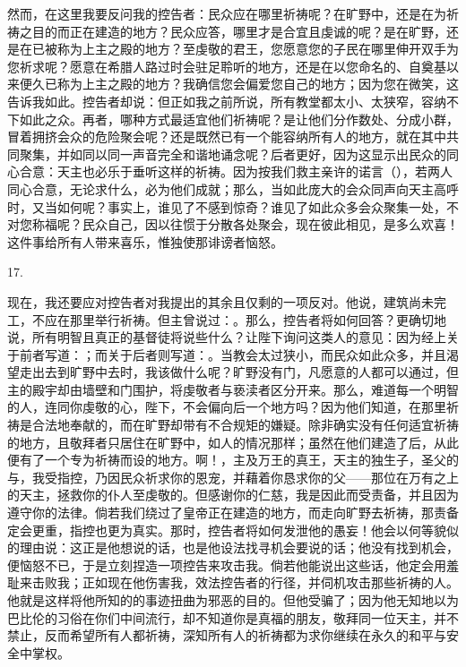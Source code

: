然而，在这里我要反问我的控告者：民众应在哪里祈祷呢？在旷野中，还是在为祈祷之目的而正在建造的地方？民众应答，哪里才是合宜且虔诚的呢？是在旷野，还是在已被称为上主之殿的地方？至虔敬的君王，您愿意您的子民在哪里伸开双手为您祈求呢？愿意在希腊人路过时会驻足聆听的地方，还是在以您命名的、自奠基以来便久已称为上主之殿的地方？我确信您会偏爱您自己的地方；因为您在微笑，这告诉我如此。控告者却说：但正如我之前所说，所有教堂都太小、太狭窄，容纳不下如此之众。再者，哪种方式最适宜他们祈祷呢？是让他们分作数处、分成小群，冒着拥挤会众的危险聚会呢？还是既然已有一个能容纳所有人的地方，就在其中共同聚集，并如同以同一声音完全和谐地诵念呢？后者更好，因为这显示出民众的同心合意：天主也必乐于垂听这样的祈祷。因为按我们救主亲许的诺言（），若两人同心合意，无论求什么，必为他们成就；那么，当如此庞大的会众同声向天主高呼时，又当如何呢？事实上，谁见了不感到惊奇？谁见了如此众多会众聚集一处，不对您称福呢？民众自己，因以往惯于分散各处聚会，现在彼此相见，是多么欢喜！这件事给所有人带来喜乐，惟独使那诽谤者恼怒。\par

17. \par

现在，我还要应对控告者对我提出的其余且仅剩的一项反对。他说，建筑尚未完工，不应在那里举行祈祷。但主曾说过：。那么，控告者将如何回答？更确切地说，所有明智且真正的基督徒将说些什么？让陛下询问这类人的意见：因为经上关于前者写道：；而关于后者则写道：。当教会太过狭小，而民众如此众多，并且渴望走出去到旷野中去时，我该做什么呢？旷野没有门，凡愿意的人都可以通过，但主的殿宇却由墙壁和门围护，将虔敬者与亵渎者区分开来。那么，难道每一个明智的人，连同你虔敬的心，陛下，不会偏向后一个地方吗？因为他们知道，在那里祈祷是合法地奉献的，而在旷野却带有不合规矩的嫌疑。除非确实没有任何适宜祈祷的地方，且敬拜者只居住在旷野中，如人的情况那样；虽然在他们建造了后，从此便有了一个专为祈祷而设的地方。啊！，主及万王的真王，天主的独生子，圣父的与，我受指控，乃因民众祈求你的恩宠，并藉着你恳求你的父——那位在万有之上的天主，拯救你的仆人至虔敬的。但感谢你的仁慈，我是因此而受责备，并且因为遵守你的法律。倘若我们绕过了皇帝正在建造的地方，而走向旷野去祈祷，那责备定会更重，指控也更为真实。那时，控告者将如何发泄他的愚妄！他会以何等貌似的理由说：这正是他想说的话，也是他设法找寻机会要说的话；他没有找到机会，便恼怒不已，于是立刻捏造一项控告来攻击我。倘若他能说出这些话，他定会用羞耻来击败我；正如现在他伤害我，效法控告者的行径，并伺机攻击那些祈祷的人。他就是这样将他所知的的事迹扭曲为邪恶的目的。但他受骗了；因为他无知地以为巴比伦的习俗在你们中间流行，却不知道你是真福的朋友，敬拜同一位天主，并不禁止，反而希望所有人都祈祷，深知所有人的祈祷都为求你继续在永久的和平与安全中掌权。\par


